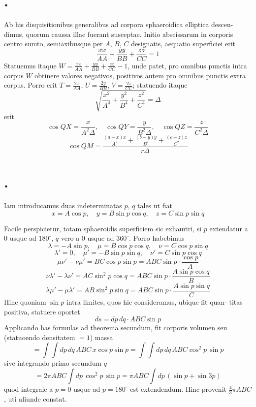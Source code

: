 \documentclass[12pt,a4paper]{article}
\theoremstyle{gauss}
\begin{document}
\section*{%
%
\thesection.}

Ab his disquisitionibus generalibus ad corpora sphaeroidica elliptica descen-
dimus, quorum caussa illae fuerant susceptae. Initio abscissarum in corporis
centro sumto, semiaxibusque per $A$, $B$, $C$ designatis, aequatio superficiei erit
\[
\frac{xx}{AA} + \frac{yy}{BB} + \frac{zz}{CC} = 1
\]
Statuemus itaque $W = \frac{xx}{AA} + \frac{yy}{BB} + \frac{zz}{CC} - 1$, unde patet, pro omnibus
punctis intra corpus $W$ obtinere valores negativos, positivos autem pro omnibus
punctis extra corpus. Porro erit $T = \frac{2x}{AA}$, $U = \frac{2y}{BB}$, $V = \frac{2z}{CC}$; statuendo
itaque
\[
\sqrt{\frac{x^2}{A^4} + \frac{y^2}{B^4} + \frac{z^2}{C^4}} = \Delta
\]
erit
\[
\cos QX = \frac{x}{A^2\Delta},\quad \cos QY = \frac{y}{B^2\Delta},\quad \cos QZ = \frac{z}{C^2\Delta}
\]
\[
\cos QM = \frac{\frac{(a-x)x}{A^2} + \frac{(b-y)y}{B^2} + \frac{(c-z)z}{C^2}}{r\Delta}
\]

\section*{%
%
\thesection.}

Iam introducamus duas indeterminatas $p$, $q$ tales ut fiat
\[
x = A\cos p,\quad y = B\sin p\cos q,\quad z = C\sin p\sin q
\]

\newpage
\setcounter{page}{24}

Facile perspicietur, totam sphaeroidis superficiem sic exhauriri, si $p$ extendatur
a $0$ usque ad $180^\circ$, $q$ vero a $0$ usque ad $360^\circ$. Porro habebimus
\[
\lambda = -A\sin p,\quad \mu = B\cos p\cos q,\quad \nu = C\cos p\sin q
\]
\[
\lambda' = 0,\quad \mu' = -B\sin p\sin q,\quad \nu' = C\sin p\cos q
\]
\[
\mu\nu' - \nu\mu' = BC\cos p\sin p = ABC\sin p\cdot\frac{\cos p}{A}
\]
\[
\nu\lambda' - \lambda\nu' = AC\sin^2 p\cos q = ABC\sin p\cdot\frac{A\sin p\cos q}{B}
\]
\[
\lambda\mu' - \mu\lambda' = AB\sin^2 p\sin q = ABC\sin p\cdot\frac{A\sin p\sin q}{C}
\]
Hinc quoniam $\sin p$ intra limites, quos hic consideramus, ubique fit quan-
titas positiva, statuere oportet
\[
ds = dp\,dq\cdot ABC\sin p
\]
Applicando has formulas ad theorema secundum, fit corporis volumen seu
(statuoendo densitatem $=1$) massa
\[
= \int\!\!\int dp\,dq\,ABC\,x\cos p\sin p = \int\!\!\int dp\,dq\,ABC\cos^2 p\,\sin p
\]
sive integrando primo secundum $q$
\[
= 2\pi ABC\int dp\,\cos^2 p\,\sin p = \pi ABC\int dp\,(\sin p + \sin 3p)
\]
quod integrale a $p=0$ usque ad $p=180^\circ$ est extendendum. Hinc provenit
$\frac{4}{3}\pi ABC$, uti aliunde constat.
\end{document}
